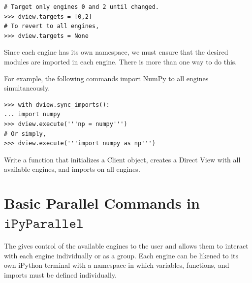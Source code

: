 \begin{lstlisting}
# Target only engines 0 and 2 until changed.
>>> dview.targets = [0,2]
# To revert to all engines,
>>> dview.targets = None
\end{lstlisting}

Since each engine has its own namespace, we must ensure that the desired modules are imported in each engine.
There is more than one way to do this. 

For example, the following commands import NumPy to all engines simultaneously.

\begin{lstlisting}
>>> with dview.sync_imports():
...	import numpy
>>> dview.execute('''np = numpy''')
# Or simply,
>>> dview.execute('''import numpy as np''')
\end{lstlisting}

\begin{problem}
Write a function  that initializes a Client object, creates a Direct View with all available engines, and imports  on all engines.
\end{problem}

\section*{Basic Parallel Commands in $\texttt{iPyParallel}$}

The  gives control of the available engines to the user and allows them to interact with each engine individually or as a group.
Each engine can be likened to its own iPython terminal with a namespace in which variables, functions, and imports must be defined individually.

